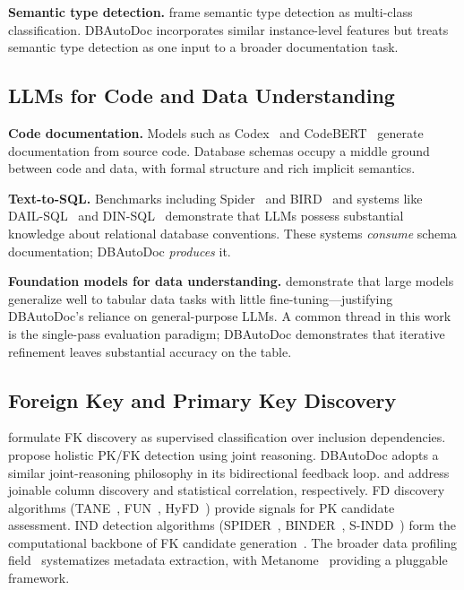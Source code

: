 \documentclass[sigconf, nonacm]{acmart}
\begin{document}
\textbf{Semantic type detection.} \cite{hulsebos2019sherlock} frame semantic type detection as multi-class classification. DBAutoDoc incorporates similar instance-level features but treats semantic type detection as one input to a broader documentation task.

\subsection{LLMs for Code and Data Understanding}

\textbf{Code documentation.} Models such as Codex~\cite{chen2021evaluating} and CodeBERT~\cite{feng2020codebert} generate documentation from source code. Database schemas occupy a middle ground between code and data, with formal structure and rich implicit semantics.

\textbf{Text-to-SQL.} Benchmarks including Spider~\cite{yu2018spider} and BIRD~\cite{li2023bird} and systems like DAIL-SQL~\cite{gao2024dailsql} and DIN-SQL~\cite{pourreza2023dinsql} demonstrate that LLMs possess substantial knowledge about relational database conventions. These systems \emph{consume} schema documentation; DBAutoDoc \emph{produces} it.

\textbf{Foundation models for data understanding.} \cite{narayan2022foundation} demonstrate that large models generalize well to tabular data tasks with little fine-tuning---justifying DBAutoDoc's reliance on general-purpose LLMs. A common thread in this work is the single-pass evaluation paradigm; DBAutoDoc demonstrates that iterative refinement leaves substantial accuracy on the table.

\subsection{Foreign Key and Primary Key Discovery}

\cite{rostin2009fk} formulate FK discovery as supervised classification over inclusion dependencies. \cite{jiang2020holistic} propose holistic PK/FK detection using joint reasoning. DBAutoDoc adopts a similar joint-reasoning philosophy in its bidirectional feedback loop. \cite{khatiwada2022alite} and \cite{ilyas2004cords} address joinable column discovery and statistical correlation, respectively. FD discovery algorithms (TANE~\cite{huhtala1999tane}, FUN~\cite{novelli2001fun}, HyFD~\cite{papenbrock2016hyfd}) provide signals for PK candidate assessment. IND detection algorithms (SPIDER~\cite{bauckmann2007spider}, BINDER~\cite{papenbrock2015binder}, S-INDD~\cite{demarchi2009sindd}) form the computational backbone of FK candidate generation~\cite{dursch2019ind}. The broader data profiling field~\cite{abedjan2018book,abedjan2015profiling,naumann2013revisited} systematizes metadata extraction, with Metanome~\cite{papenbrock2015metanome} providing a pluggable framework.
\end{document}
